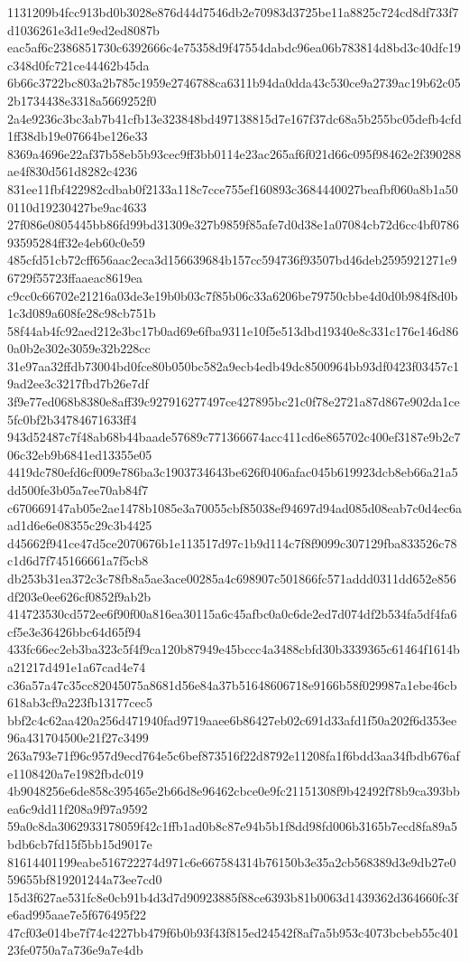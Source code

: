 {1131209b4fcc913bd0b3028e876d44d7546db2e70983d3725be11a8825c724cd8df733f7d1036261e3d1e9ed2ed8087b
eac5af6c2386851730c6392666c4e75358d9f47554dabdc96ea06b783814d8bd3c40dfc19c348d0fc721ce44462b45da
6b66c3722bc803a2b785c1959e2746788ca6311b94da0dda43c530ce9a2739ac19b62c052b1734438e3318a5669252f0
2a4e9236c3bc3ab7b41cfb13e323848bd497138815d7e167f37dc68a5b255bc05defb4cfd1ff38db19e07664be126e33
8369a4696e22af37b58eb5b93cec9ff3bb0114e23ac265af6f021d66c095f98462e2f390288ae4f830d561d8282c4236
831ee11fbf422982cdbab0f2133a118c7cce755ef160893c3684440027beafbf060a8b1a500110d19230427be9ac4633
27f086e0805445bb86fd99bd31309e327b9859f85afe7d0d38e1a07084cb72d6cc4bf078693595284ff32e4eb60c0e59
485cfd51cb72cff656aac2eca3d156639684b157cc594736f93507bd46deb2595921271e96729f55723ffaaeac8619ea
c9cc0c66702e21216a03de3e19b0b03c7f85b06c33a6206be79750cbbe4d0d0b984f8d0b1c3d089a608fe28c98cb751b
58f44ab4fc92aed212e3bc17b0ad69e6fba9311e10f5e513dbd19340e8c331c176e146d860a0b2e302e3059e32b228cc
31e97aa32ffdb73004bd0fce80b050bc582a9ecb4edb49dc8500964bb93df0423f03457c19ad2ee3c3217fbd7b26e7df
3f9e77ed068b8380e8aff39c927916277497ce427895bc21c0f78e2721a87d867e902da1ce5fc0bf2b34784671633ff4
943d52487c7f48ab68b44baade57689c771366674acc411cd6e865702c400ef3187e9b2c706c32eb9b6841ed13355e05
4419dc780efd6cf009e786ba3c1903734643be626f0406afac045b619923dcb8eb66a21a5dd500fe3b05a7ee70ab84f7
c670669147ab05e2ae1478b1085e3a70055cbf85038ef94697d94ad085d08eab7c0d4ec6aad1d6e6e08355c29c3b4425
d45662f941ce47d5ce2070676b1e113517d97c1b9d114c7f8f9099c307129fba833526c78c1d6d7f745166661a7f5cb8
db253b31ea372c3c78fb8a5ae3ace00285a4c698907c501866fc571addd0311dd652e856df203e0ee626cf0852f9ab2b
414723530cd572ee6f90f00a816ea30115a6c45afbc0a0c6de2ed7d074df2b534fa5df4fa6cf5e3e36426bbc64d65f94
433fc66ec2eb3ba323c5f4f9ca120b87949e45bccc4a3488cbfd30b3339365c61464f1614ba21217d491e1a67cad4e74
c36a57a47c35cc82045075a8681d56e84a37b51648606718e9166b58f029987a1ebe46cb618ab3cf9a223fb13177cec5
bbf2c4c62aa420a256d471940fad9719aaee6b86427eb02c691d33afd1f50a202f6d353ee96a431704500e21f27c3499
263a793e71f96c957d9ecd764e5c6bef873516f22d8792e11208fa1f6bdd3aa34fbdb676afe1108420a7e1982fbdc019
4b9048256e6de858c395465e2b66d8e96462cbce0e9fc21151308f9b42492f78b9ca393bbea6c9dd11f208a9f97a9592
59a0c8da3062933178059f42c1ffb1ad0b8c87e94b5b1f8dd98fd006b3165b7ecd8fa89a5bdb6cb7fd15f5bb15d9017e
81614401199eabe516722274d971c6e667584314b76150b3e35a2cb568389d3e9db27e059655bf819201244a73ee7cd0
15d3f627ae531fc8e0cb91b4d3d7d90923885f88ce6393b81b0063d1439362d364660fc3fe6ad995aae7e5f676495f22
47cf03e014be7f74c4227bb479f6b0b93f43f815ed24542f8af7a5b953c4073bcbeb55c40123fe0750a7a736e9a7e4db
}
